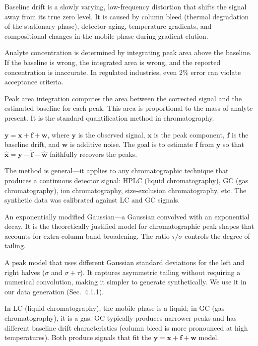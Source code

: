 \documentclass[11pt, letterpaper]{article}
\begin{document}
{Baseline drift is a slowly varying, low-frequency distortion that shifts the signal away from its true zero level.  It is caused by column bleed (thermal degradation of the stationary phase), detector aging, temperature gradients, and compositional changes in the mobile phase during gradient elution.}

{Analyte concentration is determined by integrating peak area above the baseline.  If the baseline is wrong, the integrated area is wrong, and the reported concentration is inaccurate.  In regulated industries, even 2\% error can violate acceptance criteria.}

{Peak area integration computes the area between the corrected signal and the estimated baseline for each peak.  This area is proportional to the mass of analyte present.  It is the standard quantification method in chromatography.}

{$\mathbf{y} = \mathbf{x} + \mathbf{f} + \mathbf{w}$, where $\mathbf{y}$ is the observed signal, $\mathbf{x}$ is the peak component, $\mathbf{f}$ is the baseline drift, and $\mathbf{w}$ is additive noise.  The goal is to estimate $\mathbf{f}$ from $\mathbf{y}$ so that $\hat{\mathbf{x}} = \mathbf{y} - \hat{\mathbf{f}} - \hat{\mathbf{w}}$ faithfully recovers the peaks.}

{The method is general---it applies to any chromatographic technique that produces a continuous detector signal: HPLC (liquid chromatography), GC (gas chromatography), ion chromatography, size-exclusion chromatography, etc.  The synthetic data was calibrated against LC and GC signals.}

{An exponentially modified Gaussian---a Gaussian convolved with an exponential decay.  It is the theoretically justified model for chromatographic peak shapes that accounts for extra-column band broadening.  The ratio $\tau/\sigma$ controls the degree of tailing.}

{A peak model that uses different Gaussian standard deviations for the left and right halves ($\sigma$ and $\sigma + \tau$).  It captures asymmetric tailing without requiring a numerical convolution, making it simpler to generate synthetically.  We use it in our data generation (Sec.~4.1.1).}

{In LC (liquid chromatography), the mobile phase is a liquid; in GC (gas chromatography), it is a gas.  GC typically produces narrower peaks and has different baseline drift characteristics (column bleed is more pronounced at high temperatures).  Both produce signals that fit the $\mathbf{y} = \mathbf{x} + \mathbf{f} + \mathbf{w}$ model.}
\end{document}
